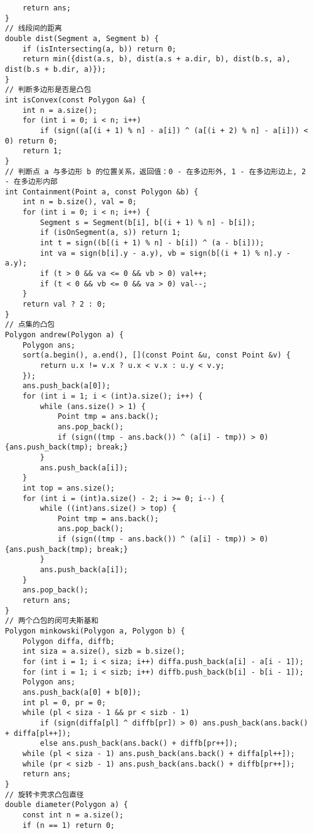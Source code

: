 \begin{verbatim}
    return ans;
}
// 线段间的距离
double dist(Segment a, Segment b) {
    if (isIntersecting(a, b)) return 0;
    return min({dist(a.s, b), dist(a.s + a.dir, b), dist(b.s, a), dist(b.s + b.dir, a)});
}
// 判断多边形是否是凸包
int isConvex(const Polygon &a) {
    int n = a.size();
    for (int i = 0; i < n; i++)
        if (sign((a[(i + 1) % n] - a[i]) ^ (a[(i + 2) % n] - a[i])) < 0) return 0;
    return 1;
}
// 判断点 a 与多边形 b 的位置关系，返回值：0 - 在多边形外, 1 - 在多边形边上, 2 - 在多边形内部
int Containment(Point a, const Polygon &b) {
    int n = b.size(), val = 0;
    for (int i = 0; i < n; i++) {
        Segment s = Segment(b[i], b[(i + 1) % n] - b[i]);
        if (isOnSegment(a, s)) return 1;
        int t = sign((b[(i + 1) % n] - b[i]) ^ (a - b[i]));
        int va = sign(b[i].y - a.y), vb = sign(b[(i + 1) % n].y - a.y);
        if (t > 0 && va <= 0 && vb > 0) val++;
        if (t < 0 && vb <= 0 && va > 0) val--;
    }
    return val ? 2 : 0;
}
// 点集的凸包
Polygon andrew(Polygon a) {
    Polygon ans;
    sort(a.begin(), a.end(), [](const Point &u, const Point &v) {
        return u.x != v.x ? u.x < v.x : u.y < v.y;
    });
    ans.push_back(a[0]);
    for (int i = 1; i < (int)a.size(); i++) {
        while (ans.size() > 1) {
            Point tmp = ans.back();
            ans.pop_back();
            if (sign((tmp - ans.back()) ^ (a[i] - tmp)) > 0) {ans.push_back(tmp); break;}
        }
        ans.push_back(a[i]);
    }
    int top = ans.size();
    for (int i = (int)a.size() - 2; i >= 0; i--) {
        while ((int)ans.size() > top) {
            Point tmp = ans.back();
            ans.pop_back();
            if (sign((tmp - ans.back()) ^ (a[i] - tmp)) > 0) {ans.push_back(tmp); break;}
        }
        ans.push_back(a[i]);
    }
    ans.pop_back();
    return ans;
}
// 两个凸包的闵可夫斯基和
Polygon minkowski(Polygon a, Polygon b) {
    Polygon diffa, diffb;
    int siza = a.size(), sizb = b.size();
    for (int i = 1; i < siza; i++) diffa.push_back(a[i] - a[i - 1]);
    for (int i = 1; i < sizb; i++) diffb.push_back(b[i] - b[i - 1]);
    Polygon ans;
    ans.push_back(a[0] + b[0]);
    int pl = 0, pr = 0;
    while (pl < siza - 1 && pr < sizb - 1)
        if (sign(diffa[pl] ^ diffb[pr]) > 0) ans.push_back(ans.back() + diffa[pl++]);
        else ans.push_back(ans.back() + diffb[pr++]);
    while (pl < siza - 1) ans.push_back(ans.back() + diffa[pl++]);
    while (pr < sizb - 1) ans.push_back(ans.back() + diffb[pr++]);
    return ans;
}
// 旋转卡壳求凸包直径
double diameter(Polygon a) {
    const int n = a.size();
    if (n == 1) return 0;

\end{verbatim}
